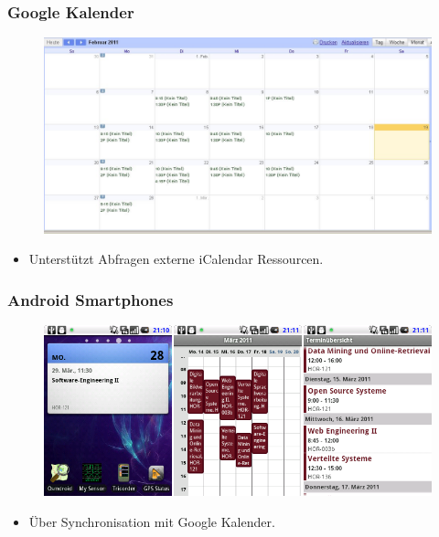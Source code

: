 \documentclass{beamer}
\begin{document}
\begin{frame}\frametitle{Google Kalender}
  \begin{figure}
    \centering
    \includegraphics[height=0.5\paperheight]{images/dhbwcalendar-google.jpg}
  \end{figure}
  \begin{itemize}
    \item Unterstützt Abfragen externe iCalendar Ressourcen.
  \end{itemize}
\end{frame}

\begin{frame}\frametitle{Android Smartphones}
  \begin{figure}
    \centering
    \includegraphics[height=0.5\paperheight]{images/dhbwcalendar-android.png}
  \end{figure}
  \begin{itemize}
    \item Über Synchronisation mit Google Kalender.
  \end{itemize}
\end{frame}
\end{document}
